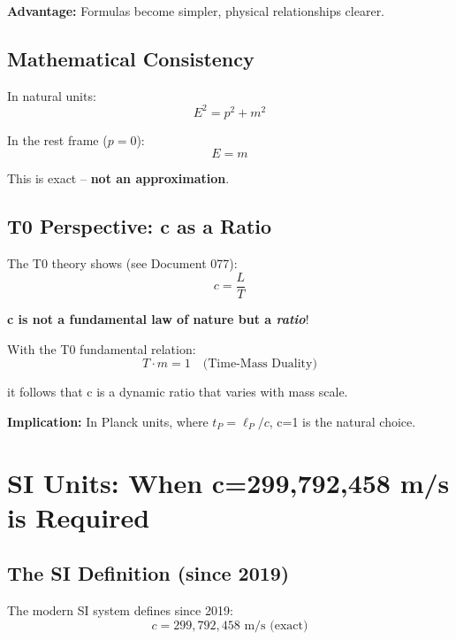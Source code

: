	\textbf{Advantage:} Formulas become simpler, physical relationships clearer.
	
	\subsection{Mathematical Consistency}
	
	In natural units:
	\begin{equation}
		E^2 = p^2 + m^2
	\end{equation}
	
	In the rest frame ($p=0$):
	\begin{equation}
		E = m
	\end{equation}
	
	This is exact -- \textbf{not an approximation}.
	
	\subsection{T0 Perspective: c as a Ratio}
	
	The T0 theory shows (see Document 077):
	\begin{equation}
		c = \frac{L}{T}
	\end{equation}
	
	\textbf{c is not a fundamental law of nature but a \emph{ratio}}!
	
	With the T0 fundamental relation:
	\begin{equation}
		T \cdot m = 1 \quad \text{(Time-Mass Duality)}
	\end{equation}
	
	it follows that c is a dynamic ratio that varies with mass scale.
	
	\textbf{Implication:} In Planck units, where $t_P = \ell_P/c$, c=1 is the natural choice.
	
	\section{SI Units: When c=299,792,458 m/s is Required}
	
	\subsection{The SI Definition (since 2019)}
	
	The modern SI system defines since 2019:
	\begin{equation}
		\boxed{c = 299,792,458 \text{ m/s} \text{ (exact)}}
	\end{equation}
	
